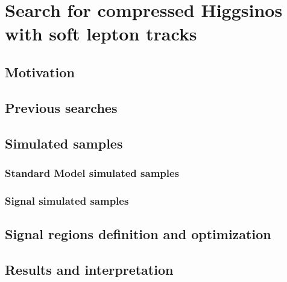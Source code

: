 \chapter{Search for compressed Higgsinos  with soft
lepton tracks}

\section{Motivation}

\section{Previous searches}




\section{Simulated samples}
\subsection{Standard Model simulated samples}
\label{sec:sm-mc}
\subsection{Signal simulated samples}
\label{signal-simulation}









\clearpage
\section{Signal regions definition and optimization}


\clearpage
\section{Results and interpretation}


